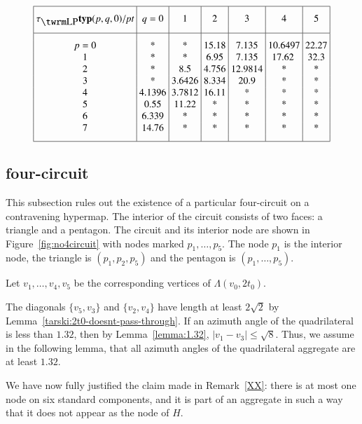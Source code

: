 \begin{equation}
\vbox{\offinterlineskip \hrule
\halign{&\vrule#&\strut\ \hfil#\hfil\ \cr   %
height 7pt&\omit&&\omit&&\omit&&\omit&&\omit&&\omit&&\omit&\cr
&\hfil $\tlp{\pqr{(p,q,0)}}/\pt$\hfil
        &&\hfil $q=0$\hfil
        &&\hfil1\hfil
        &&\hfil2\hfil
        &&\hfil3\hfil
        &&\hfil4\hfil
        &&\hfil5\hfil&
\cr height 7pt&\omit&&\omit&&\omit&&\omit&&\omit&&\omit&&\omit&\cr
\noalign{\hrule}
height7pt&\omit&&\omit&&\omit&&\omit&&\omit&&\omit&&\omit&\cr
&$p=0$&& *&& *&& 15.18&& 7.135&& 10.6497&& 22.27&\cr &1&&    *&& *&&
6.95&& 7.135&&17.62  && 32.3&\cr &2&&    *&&
8.5&&4.756&&12.9814&&*&&*&\cr &3&& *&& 3.6426&&8.334&&20.9&&*&&*&\cr
&4&&4.1396&&3.7812&&16.11&&*&&*&&*&\cr
&5&&0.55&&11.22&&*&&*&&*&&*&\cr &6&&6.339&&*&&*&&*&&*&&*&\cr
&7&&14.76&&*&&*&&*&&*&&*&\cr
height7pt&\omit&&\omit&&\omit&&\omit&&\omit&&\omit&&\omit&\cr}
\hrule }
    \label{eqn:old5.1:bis}
\end{equation}



\subsection{four-circuit}
\label{sec:impossible-circuit}

This subsection rules out the existence of a particular four-circuit
on a contravening hypermap.  The interior of the circuit consists of
two faces: a triangle and a pentagon.  The circuit and its interior
node are shown in Figure~\ref{fig:no4circuit} with nodes marked
$p_1,\ldots,p_5$. The node $p_1$ is the interior node, the triangle
is $(p_1,p_2,p_5)$ and the pentagon is $(p_1,\ldots,p_5)$.


Let $v_1,\ldots,v_4,v_5$ be the corresponding vertices of $\Lambda(v_0,2t_0)$.

The diagonals $\{v_5,v_3\}$ and $\{v_2,v_4\}$ have length at least
$2\sqrt2$ by Lemma~\ref{tarski:2t0-doesnt-pass-through}.  If an
azimuth angle of the  quadrilateral is less than $1.32$, then by
Lemma~\ref{lemma:1.32},  $|v_1-v_3|\le\sqrt{8}$.  Thus, we
assume in the following lemma, that all azimuth angles of the
quadrilateral aggregate are at least $1.32$.


\begin{remark}
We have now fully justified the claim made in
Remark~\ref{XX}: there is at most one node on six
standard components, and it is part of an aggregate in such a way that
it does not appear as the node of $H$.
\end{remark}


